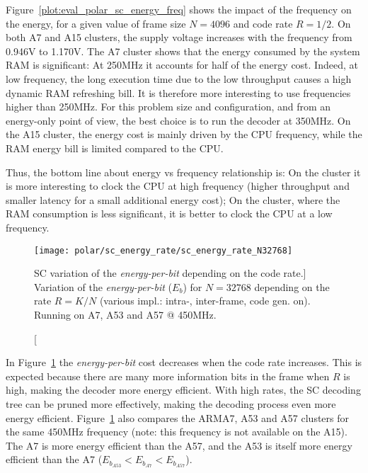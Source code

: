 Figure~\ref{plot:eval_polar_sc_energy_freq} shows the impact of the frequency on
the energy, for a given value of frame size $N=4096$ and code rate $R=1/2$. On
both A7 and A15 clusters, the supply voltage increases with the frequency from
0.946V to 1.170V. The A7 \little cluster shows that the energy consumed by the
system RAM is significant: At 250MHz it accounts for half of the energy cost.
Indeed, at low frequency, the long execution time due to the low throughput
causes a high dynamic RAM refreshing bill. It is therefore more interesting to
use frequencies higher than 250MHz. For this problem size and configuration, and
from an energy-only point of view, the best choice is to run the decoder at
350MHz. On the A15 \big cluster, the energy cost is mainly driven by the CPU
frequency, while the RAM energy bill is limited compared to the CPU.

Thus, the bottom line about energy vs frequency relationship is: On the \little
cluster it is more interesting to clock the CPU at high frequency (higher
throughput and smaller latency for a small additional energy cost); On the
\big cluster, where the RAM consumption is less significant, it is better to
clock the CPU at a low frequency.

\begin{figure}[htp]
  \centering
  \texttt{[image: polar/sc\_energy\_rate/sc\_energy\_rate\_N32768]}
  \caption
    [SC variation of the \emph{energy-per-bit} depending on the code rate.]
    {Variation of the \emph{energy-per-bit} ($E_b$) for $N = 32768$ depending on
    the rate $R = K / N$ (various impl.: intra-, inter-frame, code gen. on).
    Running on A7, A53 and A57 @ 450MHz.}
  \label{plot:eval_polar_sc_energy_rate}
\end{figure}

In Figure~\ref{plot:eval_polar_sc_energy_rate} the \emph{energy-per-bit} cost
decreases when the code rate increases. This is expected because there are many
more information bits in the frame when $R$ is high, making the decoder more
energy efficient. With high rates, the SC decoding tree can be pruned more
effectively, making the decoding process even more energy efficient.
Figure~\ref{plot:eval_polar_sc_energy_rate} also compares the ARM\R A7, A53 and
A57 clusters for the same 450MHz frequency (note: this frequency is not
available on the A15). The \little A7 is more energy efficient than the \big
A57, and the \little A53 is itself more energy efficient than the \little A7
($E_{b_{A53}} < E_{b_{A7}} < E_{b_{A57}}$).


